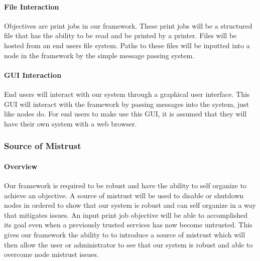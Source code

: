 \documentclass[draftclsnofoot, onecolumn, compsoc, 10pt]{IEEEtran}
\begin{document}
\paragraph{File Interaction}
Objectives are print jobs in our framework. These print jobs will be a structured file that has the ability to be read and be printed by a printer. Files will be hosted from an end users file system. Paths to these files will be inputted into a node in the framework by the simple message passing system. 


\paragraph{GUI Interaction}
End users will interact with our system through a graphical user interface. This GUI will interact with the framework by passing messages into the system, just like nodes do. For end users to make use this GUI, it is assumed that they will have their own system with a web browser.


\subsubsection{Source of Mistrust}
\paragraph{Overview} 
Our framework is required to be robust and have the ability to self organize to achieve an objective. A source of mistrust will be used to disable or shutdown nodes in ordered to show that our system is robust and can self organize in a way that mitigates issues. An input print job objective will be able to accomplished its goal even when a previously trusted services has now become untrusted. This gives our framework the ability to to introduce a source of mistrust which will then allow the user or administrator to see that our system is robust and able to overcome node mistrust issues.

\end{document}
